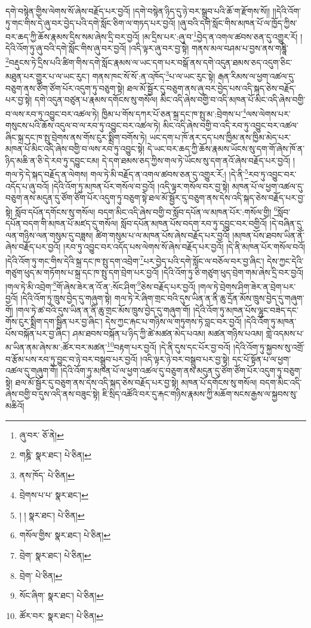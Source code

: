 དགེ་བསྙེན་གྱིས་ལེགས་སོ་ཞེས་བརྗོད་པར་བྱའོ། །དགེ་བསྙེན་ཉིད་དུ་ཉེ་བར་སྒྲུབ་པའི་ཆོ་ག་རྫོགས་སོ།། །།དེའི་འོག་ཏུ་གང་གིས་དེ་ཞུ་བར་བྱེད་པའི་དགེ་སློང་ཅིག་ལ་གཏད་པར་བྱའོ། །ཞུ་བའི་དགེ་སློང་གིས་མཁན་པོ་ལ་ཁྱོད་ཀྱིས་བར་ཆད་ཀྱི་ཆོས་རྣམས་དྲིས་སམ་ཞེས་དྲི་བར་བྱའོ། །མ་དྲིས་པར་:ཞུ་བ་\footnote{ཞུ་བར་  ཅོ་ནེ། }བྱེད་ན་འགལ་ཚབས་ཅན་དུ་འགྱུར་རོ། །དེའི་འོག་ཏུ་ཞུ་བའི་དགེ་སློང་གིས་ཞུ་བར་བྱའོ། །འདི་ལྟར་ཞུ་བར་བྱ་སྟེ། གནས་མལ་བཤམ་པ་བྱས་ནས་གཎྜཱི་\footnote{གཎྜི་  སྣར་ཐང་།  པེ་ཅིན། }བརྡུངས་ཏེ་དྲིས་པའི་ཚིག་གིས་དགེ་སློང་རྣམས་ལ་ཡང་དག་པར་བསྒོ་ནས་དགེ་འདུན་ཐམས་ཅད་འདུག་ཅིང་མཐུན་པར་གྱུར་པ་ལ་ཡང་རུང་། གནས་ཁང་སོ་སོ་:ན་འཁོད་\footnote{ནས་ཁོད་  པེ་ཅིན། }པ་ལ་ཡང་རུང་སྟེ། རྒན་རིམས་ལ་ཕྱག་འཚལ་དུ་བཅུག་ནས་ཙོག་ཙོག་པོར་འདུག་ཏུ་བཅུག་སྟེ། ཐལ་མོ་སྦྱོར་དུ་བཅུག་ནས་ཞུ་བར་བྱེད་པས་འདི་སྐད་ཅེས་བརྗོད་པར་བྱ་སྟེ། དགེ་འདུན་བཙུན་པ་རྣམས་དགོངས་སུ་གསོལ། མིང་འདི་ཞེས་བགྱི་བ་འདི་མཁན་པོ་མིང་འདི་ཞེས་བགྱི་བ་ལས་རབ་ཏུ་འབྱུང་བར་འཚལ་ཏེ། ཁྱིམ་པ་གོས་དཀར་པོ་ཅན་སྐྲ་དང་ཁ་སྤུ་མ་:བྲེགས་པ་\footnote{བྲེགས་པ་པ་  སྣར་ཐང་། }ལས་ལེགས་པར་གསུངས་པའི་ཆོས་འདུལ་བ་ལ་རབ་ཏུ་འབྱུང་བར་འཚལ་ཏེ། མིང་འདི་ཞེས་བགྱི་བ་འདི་རབ་ཏུ་འབྱུང་བར་འཚལ་ཞིང་སྐྲ་དང་ཁ་སྤུ་བྲེགས་ནས་གོས་ངུར་སྨྲིག་བགོས་ཏེ། ཡང་དག་པ་ཁོ་ནར་དད་པས་ཁྱིམ་ནས་ཁྱིམ་མེད་པར་མཁན་པོ་མིང་འདི་ཞེས་བགྱི་བ་ལས་རབ་ཏུ་འབྱུང་སྟེ། དེ་ཡང་བར་ཆད་ཀྱི་ཆོས་རྣམས་ཡོངས་སུ་དག་གོ་ཞེས་ཁོ་ན་ཉིད་མཆི་ན་ཅི་དེ་རབ་ཏུ་དབྱུང་ངམ། དེ་དག་ཐམས་ཅད་ཀྱིས་གལ་ཏེ་ཡོངས་སུ་དག་ནའོ་ཞེས་བརྗོད་པར་བྱའོ། །གལ་ཏེ་དེ་སྐད་བརྗོད་ན་ལེགས། གལ་ཏེ་མི་བརྗོད་ན་འགལ་ཚབས་ཅན་དུ་འགྱུར་རོ:། །དེ་ནི་\footnote{། །  སྣར་ཐང་།  པེ་ཅིན། }རབ་ཏུ་འབྱུང་བར་འདོད་པ་ཞུ་བའོ། །དེའི་འོག་ཏུ་མཁན་པོར་གསོལ་བ་བྱའོ། །འདི་ལྟར་གསོལ་བར་བྱ་སྟེ། མཁན་པོ་ལ་ཕྱག་འཚལ་དུ་བཅུག་ནས་མདུན་དུ་ཙོག་ཙོག་པོར་འདུག་ཏུ་བཅུག་སྟེ་ཐལ་མོ་སྦྱོར་དུ་བཅུག་ནས་དེས་འདི་སྐད་ཅེས་བརྗོད་པར་བྱ་སྟེ། སློབ་དཔོན་དགོངས་སུ་གསོལ། བདག་མིང་འདི་ཞེས་བགྱི་བ་སློབ་དཔོན་ལ་མཁན་པོར་:གསོལ་གྱི། \footnote{གསོལ་གྱིས་  སྣར་ཐང་།  པེ་ཅིན། }སློབ་དཔོན་བདག་གི་མཁན་པོ་མཛད་དུ་གསོལ། སློབ་དཔོན་མཁན་པོས་བདག་རབ་ཏུ་དབྱུང་བར་བགྱིའོ། །དེ་བཞིན་དུ་ལན་གཉིས་ལན་གསུམ་དུ་བཟླས། ཚིག་གསུམ་པ་ལ་མཁན་པོས་ཞེས་བརྗོད་པར་བྱའོ། །མཁན་པོས་ཐབས་ཡིན་ནོ་ཞེས་བརྗོད་པར་བྱའོ། །རབ་ཏུ་འབྱུང་བར་འདོད་པས་ལེགས་སོ་ཞེས་བརྗོད་པར་བྱའོ། །དེ་ནི་མཁན་པོར་གསོལ་བའོ། །དེའི་འོག་ཏུ་གང་གིས་དེའི་སྐྲ་དང་ཁ་སྤུ་དག་འབྲེག་\footnote{བྲེག་  སྣར་ཐང་།  པེ་ཅིན། }པར་བྱེད་པའི་དགེ་སློང་ལ་བཅོལ་བར་བྱ་ཞིང་། དེས་ཀྱང་དེའི་གཙུག་ཕུད་མ་གཏོགས་པ་སྐྲ་དང་ཁ་སྤུ་དག་བྲེག་པར་བྱའོ། །དེའི་འོག་ཏུ་ཅི་གཙུག་ཕུད་བྲེག་གམ་ཞེས་དྲི་བར་བྱའོ། །གལ་ཏེ་མི་འབྲེག་\footnote{བྲེག་  པེ་ཅིན། }གོ་ཞེས་ཟེར་ན་འོ་ན་:སོང་ཤིག་\footnote{སོང་ཞིག་  སྣར་ཐང་།  པེ་ཅིན། }ཅེས་བརྗོད་པར་བྱའོ། །གལ་ཏེ་བྲེགས་ཤིག་ཟེར་ན་བྲེག་པར་བྱའོ། །དེའི་འོག་ཏུ་ཁྲུས་བྱེད་དུ་གཞུག་སྟེ། གལ་ཏེ་རེ་ཞིག་གྲང་བའི་དུས་ཡིན་ན་ནི་ཆུ་དྲོན་མོས་ཁྲུས་བྱེད་དུ་གཞུག་གོ། །གལ་ཏེ་ཚ་བའི་དུས་ཡིན་ན་ནི་ཆུ་གྲང་མོས་ཁྲུས་བྱེད་དུ་གཞུག་གོ། །དེའི་འོག་ཏུ་མཁན་པོས་ལྷུང་བཟེད་དང་གོས་ངུར་སྨྲིག་དག་སྦྱིན་པར་བྱ་ཞིང་། དེས་ཀྱང་རྐང་པ་གཉིས་ལ་གཏུགས་ཏེ་བླང་བར་བྱའོ། །དེའི་འོག་ཏུ་མཁན་པོས་བསྐོན་པར་བྱ་ཞིང་། ཤམ་ཐབས་བསྐོན་པ་ཉིད་ཀྱི་ཚེ་མཚན་མེད་པའམ། མཚན་གཉིས་པའམ། གླེ་འདམས་པ་མ་ཡིན་ནམ་ཞེས་མ་:ཚོར་བར་མཚན་\footnote{ཚོར་བར་  སྣར་ཐང་།  པེ་ཅིན། }བརྟག་པར་བྱའོ། །དེ་ནི་དུས་དང་པོར་བྱ་བའོ། །དེའི་འོག་ཏུ་སྐྱབས་སུ་འགྲོ་བ་རྩོམ་པས་རབ་ཏུ་བྱུང་བ་ཉེ་བར་བསྒྲུབ་པར་བྱའོ། །འདི་ལྟར་ཉེ་བར་བསྒྲུབ་པར་བྱ་སྟེ། དང་པོ་སྟོན་པ་ལ་ཕྱག་འཚལ་དུ་གཞུག་གོ། །དེའི་འོག་ཏུ་མཁན་པོ་ལ་ཕྱག་འཚལ་དུ་བཅུག་ནས་མདུན་དུ་ཙོག་ཙོག་པོར་འདུག་ཏུ་བཅུག་སྟེ། ཐལ་མོ་སྦྱོར་དུ་བཅུག་ནས་དེས་འདི་སྐད་ཅེས་བརྗོད་པར་བྱ་སྟེ། མཁན་པོ་དགོངས་སུ་གསོལ། བདག་མིང་འདི་ཞེས་བགྱི་བ་དུས་འདི་ནས་བཟུང་སྟེ། ཇི་སྲིད་འཚོའི་བར་དུ་རྐང་གཉིས་རྣམས་ཀྱི་མཆོག་སངས་རྒྱས་ལ་སྐྱབས་སུ་མཆིའོ། 